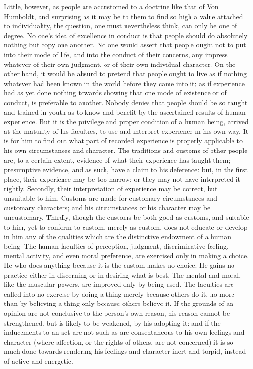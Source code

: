 \documentclass[11pt,openany]{book}
\begin{document}
Little, however, as people are accustomed to a doctrine like that of Von Humboldt, and surprising as it may be to them to find so high a value attached to individuality, the question, one must nevertheless think, can only be one of degree. No one's idea of excellence in conduct is that people should do absolutely nothing but copy one another. No one would assert that people ought not to put into their mode of life, and into the conduct of their concerns, any impress whatever of their own judgment, or of their own individual character. On the other hand, it would be absurd to pretend that people ought to live as if nothing whatever had been known in the world before they came into it; as if experience had as yet done nothing towards showing that one mode of existence or of conduct, is preferable to another. Nobody denies that people should be so taught and trained in youth as to know and benefit by the ascertained results of human experience. But it is the privilege and proper condition of a human being, arrived at the maturity of his faculties, to use and interpret experience in his own way. It is for him to find out what part of recorded experience is properly applicable to his own circumstances and character. The traditions and customs of other people are, to a certain extent, evidence of what their experience has taught them; presumptive evidence, and as such, have a claim to his deference: but, in the first place, their experience may be too narrow; or they may not have interpreted it rightly. Secondly, their interpretation of experience may be correct, but unsuitable to him. Customs are made for customary circumstances and customary characters; and his circumstances or his character may be uncustomary. Thirdly, though the customs be both good as customs, and suitable to him, yet to conform to custom, merely as custom, does not educate or develop in him any of the qualities which are the distinctive endowment of a human being. The human faculties of perception, judgment, discriminative feeling, mental activity, and even moral preference, are exercised only in making a choice. He who does anything because it is the custom makes no choice. He gains no practice either in discerning or in desiring what is best. The mental and moral, like the muscular powers, are improved only by being used. The faculties are called into no exercise by doing a thing merely because others do it, no more than by believing a thing only because others believe it. If the grounds of an opinion are not conclusive to the person's own reason, his reason cannot be strengthened, but is likely to be weakened, by his adopting it: and if the inducements to an act are not such as are consentaneous to his own feelings and character (where affection, or the rights of others, are not concerned) it is so much done towards rendering his feelings and character inert and torpid, instead of active and energetic.
\end{document}
